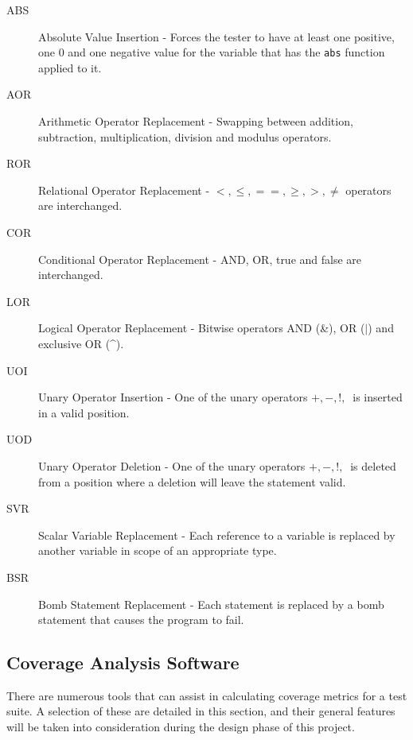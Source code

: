 \begin{description}
\item[ABS] Absolute Value Insertion - Forces the tester to have at least one positive, one 0 and one negative value for the variable that has the \verb+abs+ function applied to it.
\item[AOR] Arithmetic Operator Replacement - Swapping between addition, subtraction, multiplication, division and modulus operators.
\item[ROR] Relational Operator Replacement - $<, \leq, ==, \geq, >, \neq$ operators are interchanged.
\item[COR] Conditional Operator Replacement - AND, OR, true and false are interchanged.
\item[LOR] Logical Operator Replacement - Bitwise operators AND (\&), OR ($\mid$) and exclusive OR (\^{}).
\item[UOI] Unary Operator Insertion - One of the unary operators $+, -, !, ~ $ is inserted in a valid position.
\item[UOD] Unary Operator Deletion - One of the unary operators $+, -, !, ~ $ is deleted from a position where a deletion will leave the statement valid.
\item[SVR] Scalar Variable Replacement - Each reference to a variable is replaced by another variable in scope of an appropriate type.
\item[BSR] Bomb Statement Replacement - Each statement is replaced by a bomb statement that causes the program to fail.
\end{description}

\subsection{Coverage Analysis Software}

There are numerous tools that can assist in calculating coverage metrics for a test suite. A selection of these are detailed in this section, and their general features will be taken into consideration during the design phase of this project.




% 
